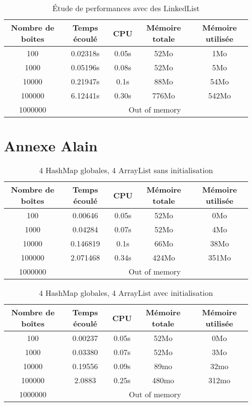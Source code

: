 \begin{table}[htbp]
  \centering
\begin{tabular}{|c|c|c|c|c|}
\hline
Nombre de boîtes & Temps écoulé & CPU & Mémoire totale & Mémoire utilisée\\
\hline
100 & 0.02318s & 0.05s & 52Mo & 1Mo\\
\hline
1000 & 0.05196s & 0.08s & 52Mo & 5Mo\\
\hline
10000 & 0.21947s & 0.1s & 88Mo & 54Mo\\
\hline
100000 & 6.12441s & 0.30s & 776Mo & 542Mo\\
\hline
1000000 & \multicolumn{4}{|c|}{Out of memory}\\
\hline
\end{tabular}
\caption{Étude de performances avec des LinkedList}
\end{table}

\section{Annexe Alain}
\begin{table}[h]
  \centering
\begin{tabular}{|c|c|c|c|c|}
\hline
Nombre de boîtes & Temps écoulé & CPU & Mémoire totale & Mémoire utilisée\\
\hline
100 & 0.00646& 0.05s & 52Mo & 0Mo\\
\hline
1000 & 0.04284 & 0.07s & 52Mo & 4Mo\\
\hline
10000 & 0.146819 & 0.1s & 66Mo & 38Mo\\
\hline
100000 &2.071468 & 0.34s & 424Mo & 351Mo\\
\hline
1000000 & \multicolumn{4}{|c|}{Out of memory}\\
\hline
\end{tabular}
\caption{4 HashMap globales, 4 ArrayList sans initialisation}
\end{table}


\begin{table}[h]
  \centering
\begin{tabular}{|c|c|c|c|c|}
\hline
Nombre de boîtes & Temps écoulé & CPU & Mémoire totale & Mémoire utilisée\\
\hline
100 & 0.00237& 0.05s & 52Mo & 0Mo\\
\hline
1000 & 0.03380 & 0.07s & 52Mo & 3Mo\\
\hline
10000 & 0.19556 & 0.09s & 89mo & 32mo\\
\hline
100000 & 2.0883 & 0.25s & 480mo & 312mo\\
\hline
1000000 & \multicolumn{4}{|c|}{Out of memory}\\
\hline
\end{tabular}
\caption{4 HashMap globales, 4 ArrayList avec  initialisation}
\end{table}












